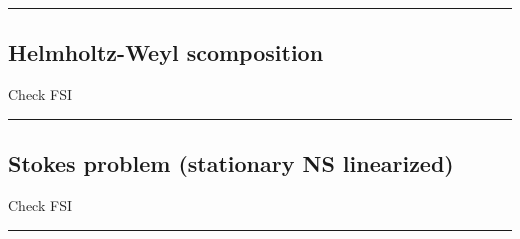 \rule{0.31\textwidth}{0.2pt}


\subsection{\texorpdfstring{\color{red}Helmholtz-Weyl scomposition}{}}


Check FSI

\rule{0.31\textwidth}{0.2pt}


\subsection{\texorpdfstring{\color{red}Stokes problem (stationary NS linearized)}{}}

 
Check FSI

\rule{0.31\textwidth}{1pt}




